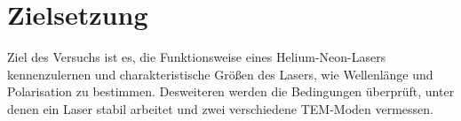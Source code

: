 \section{Zielsetzung}
\label{sec:zielsetzung}

Ziel des Versuchs ist es, die Funktionsweise eines Helium-Neon-Lasers
kennenzulernen und charakteristische Größen des Lasers, wie Wellenlänge und
Polarisation zu bestimmen. Desweiteren werden die Bedingungen überprüft, unter
denen ein Laser stabil arbeitet und zwei verschiedene TEM-Moden vermessen.
